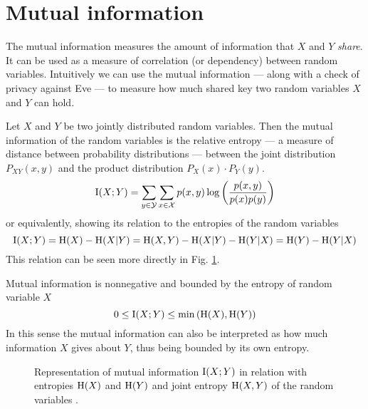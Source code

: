 \label{ch:four}
\label{ch:four}

\section{Mutual information}\label{mutInfo}
	The mutual information measures the amount of information that $X$ and $Y$ \textit{share}.
    It can be used as a measure of correlation (or dependency) between random variables.
    Intuitively we can use the mutual information --- along with a check of privacy against Eve --- to measure how much shared key two random variables $X$ and $Y$ can hold.
    \begin{definition}
	Let $X$ and $Y$ be two jointly distributed random variables. Then the mutual information of the random variables is the relative entropy --- a measure of distance between probability distributions --- between the joint distribution $P_{XY}(x,y)$ and the product distribution $P_X(x)\cdot P_Y(y)$.
	\begin{equation}
		\operatorname{I}(X;Y) = \sum_{y\in\mathcal{Y}}\sum_{x\in\mathcal{X}} p(x,y) \log\left(\frac{p(x,y)}{p(x)p(y)}\right) 
	\end{equation}
	or equivalently, showing its relation to the entropies of the random variables
	\begin{equation}
		\operatorname{I}(X;Y) = \operatorname{H}(X) - \operatorname{H}(X|Y) = \operatorname{H}(X,Y) - \operatorname{H}(X|Y) - \operatorname{H}(Y|X) = \operatorname{H}(Y) - \operatorname{H}(Y|X)
	\end{equation}
	This relation can be seen more directly in Fig. \ref{fig:mutual_info}.
    \end{definition} 
	Mutual information is nonnegative and bounded by the entropy of random variable $X$
	\begin{equation}
		0 \leq \operatorname{I}(X;Y) \leq \min \left(\operatorname{H}(X), \operatorname{H}(Y)\right)
	\end{equation}
	In this sense the mutual information can also be interpreted as how much information $X$ gives about $Y$, thus being bounded by its own entropy.
	\begin{figure}[ht]
		\centering
		
		\caption{Representation of mutual information $\operatorname{I}(X;Y)$ in relation with entropies $\operatorname{H}(X)$ and $\operatorname{H}(Y)$ and joint entropy $\operatorname{H}(X,Y)$ of the random variables .
		\label{fig:mutual_info}}
	\end{figure}	
	
